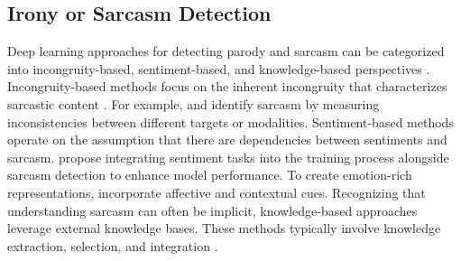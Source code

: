 \subsection{Irony or Sarcasm Detection}\label{sec:rw_methods}
Deep learning approaches for detecting parody and sarcasm can be categorized into incongruity-based, sentiment-based, and knowledge-based perspectives \citep{survey2024}. Incongruity-based methods focus on the inherent incongruity that characterizes sarcastic content \citep{riloff2013sarcasm}. For example, \citet{hazarika2018cascade} and \citet{schifanella2016detecting} identify sarcasm by measuring inconsistencies between different targets or modalities. Sentiment-based methods operate on the assumption that there are dependencies between sentiments and sarcasm. \citet{savini2020multi} propose integrating sentiment tasks into the training process alongside sarcasm detection to enhance model performance. To create emotion-rich representations, \citet{babanejad2020affective} incorporate affective and contextual cues. Recognizing that understanding sarcasm can often be implicit, knowledge-based approaches \citep{chen2022commonsense,li2021sarcasm} leverage external knowledge bases. These methods typically involve knowledge extraction, selection, and integration \citep{survey2024}.
